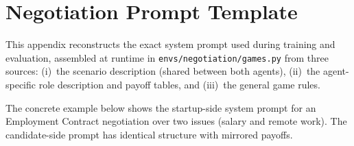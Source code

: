 \documentclass[12pt,a4paper]{article}
\begin{document}
\appendix

\section{Negotiation Prompt Template}
\label{app:prompt}

This appendix reconstructs the exact system prompt used during training and evaluation, assembled at runtime in \texttt{envs/negotiation/games.py} from three sources: (i)~the scenario description (shared between both agents), (ii)~the agent-specific role description and payoff tables, and (iii)~the general game rules.

The concrete example below shows the startup-side system prompt for an Employment Contract negotiation over two issues (salary and remote work). The candidate-side prompt has identical structure with mirrored payoffs.
\end{document}
